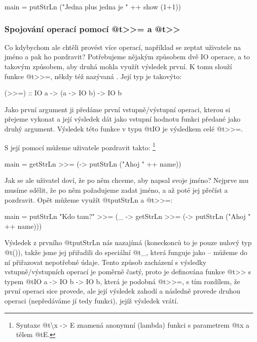 \begin{haskell}
main = putStrLn ("Jedna plus jedna je " ++ show (1+1))
\end{haskell}

\subsubsection{\texorpdfstring
  {Spojování operací pomocí @t{>>=} a @t{>>}}
  {Spojování operací pomocí >>= a >>}}

Co kdybychom ale chtěli provést více operací, například se zeptat uživatele na
jméno a pak ho pozdravit? Potřebujeme nějakým způsobem  dvě IO
operace, a to takovým způsobem, aby druhá mohla využít výsledek první. K tomu
slouží funkce @t{>>=}, někdy též nazývaná . Její typ je takovýto:

\begin{haskell}
(>>=) :: IO a -> (a -> IO b) -> IO b
\end{haskell}

Jako první argument ji předáme první vstupně/výstupní operaci, kterou si přejeme
vykonat a její výsledek dát jako vstupní hodnotu funkci předané jako druhý
argument. Výsledek této funkce  v typu @t{IO} je výsledkem celé
@t{>>=}.

S její pomocí můžeme uživatele pozdravit takto: \footnote{Syntaxe
@t{\textbackslash x -> E} znamená anonymní (lambda) funkci s parametrem @t{x} a
tělem @t{E}.}

\begin{haskell}
main = getStrLn >>= (\name -> putStrLn ("Ahoj " ++ name))
\end{haskell}
  
Jak se ale uživatel doví, že po něm chceme, aby napsal svoje jméno? Nejprve mu
musíme sdělit, že po něm požadujeme zadat jméno, a až poté jej přečíst a
pozdravit. Opět můžeme využít @t{putStrLn} a @t{>>=}:

\begin{haskell}
main = 
  putStrLn "Kdo tam?" >>= (\_ ->
    getStrLn >>= (\name ->
      putStrLn ("Ahoj " ++ name)))
\end{haskell}

Výsledek z prvního @t{putStrLn} nás nazajímá (koneckonců to je pouze nulový typ
@t{()}), takže jsme jej přiřadili do speciální  @t{_}, která
funguje jako  -- můžeme do ní přiřazovat nepotřebné údaje. Tento
způsob zacházení s výsledky vstupně/výstupních operací je poměrně častý, proto
je definována funkce @t{>>} s typem @t{IO a -> IO b -> IO b}, která je podobná
@t{>>=}, s tím rozdílem, že první operaci sice provede, ale její výsledek zahodí
a následně provede druhou operaci (nepředáváme jí tedy funkci), jejíž výsledek
vrátí.

